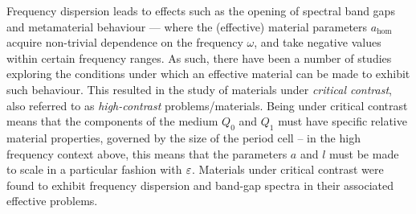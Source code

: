 Frequency dispersion leads to effects such as the opening of spectral band gaps and metamaterial behaviour --- where the (effective) material parameters $a_{\mathrm{hom}}$ acquire non-trivial dependence on the frequency $\omega$, and take negative values within certain frequency ranges.
As such, there have been a number of studies exploring the conditions under which an effective material can be made to exhibit such behaviour. 
This resulted in the study of materials under \emph{critical contrast}, also referred to as \emph{high-contrast} problems/materials.
Being under critical contrast means that the components of the medium $Q_0$ and $Q_1$ must have specific relative material properties, governed by the size of the period cell -- in the high frequency context above, this means that the parameters $a$ and $l$ must be made to scale in a particular fashion with $\varepsilon$. 
Materials under critical contrast were found to exhibit frequency dispersion and band-gap spectra in their associated effective problems.
